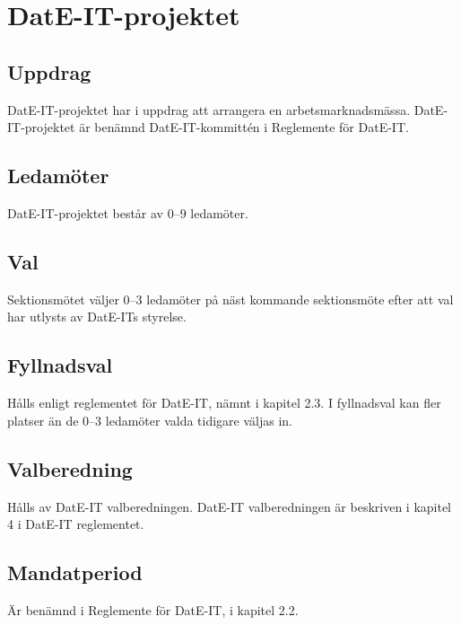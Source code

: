 \section{DatE-IT-projektet}
\subsection{Uppdrag}
DatE-IT-projektet har i uppdrag att arrangera en arbetsmarknadsmässa.
DatE-IT-projektet är benämnd DatE-IT-kommittén i Reglemente för DatE-IT.
\subsection{Ledamöter}
DatE-IT-projektet består av 0--9 ledamöter.
\subsection{Val} 
Sektionsmötet väljer 0--3 ledamöter på näst kommande sektionsmöte efter att val har utlysts av DatE-ITs styrelse.
\subsection{Fyllnadsval}
Hålls enligt reglementet för DatE-IT, nämnt i kapitel 2.3.
I fyllnadsval kan fler platser än de 0--3 ledamöter valda tidigare väljas in.
\subsection{Valberedning}
Hålls av DatE-IT valberedningen.
DatE-IT valberedningen är beskriven i kapitel 4 i DatE-IT reglementet.
\subsection{Mandatperiod}
Är benämnd i Reglemente för DatE-IT, i kapitel 2.2.

\newpage
